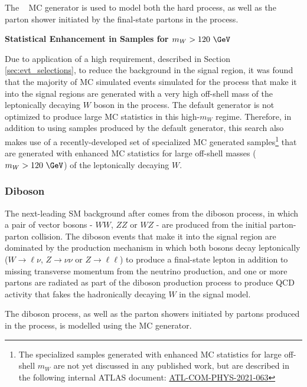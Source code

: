 The \SHERPA[2.2]~\cite{Gleisberg:2008ta} MC generator is used to model both the hard \wjets process, as well as the parton shower initiated by the final-state partons in the process. 

\medskip\noindent\textbf{Statistical Enhancement in \wjets Samples for \(m_W>120~\GeV\)}

Due to application of a high \mtlepmet requirement, described in Section \ref{sec:evt_selections}, to reduce the \wjets background in the signal region, it was found that the majority of MC simulated events simulated for the \wjets process that make it into the signal regions are generated with a very high off-shell mass of the leptonically decaying \(W\) boson in the process. The default \SHERPA[2.2] generator is not optimized to produce large MC statistics in this high-\(m_W\) regime. Therefore, in addition to using samples produced by the default \SHERPA[2.2] generator, this search also makes use of a recently-developed set of specialized \SHERPA[2.2] \wjets MC generated samples\footnote{The specialized samples generated with enhanced MC statistics for large off-shell \(m_W\) are not yet discussed in any published work, but are described in the following internal ATLAS document: \href{https://cds.cern.ch/record/2753199}{ATL-COM-PHYS-2021-063}} that are generated with enhanced MC statistics for large off-shell masses (\(m_W > 120~\GeV\)) of the leptonically decaying \(W\).

\subsubsection{Diboson}
\label{sec:diboson_description}

The next-leading SM background after \wjets comes from the diboson process, in which a pair of vector bosons - \(WW\), \(ZZ\) or \(WZ\) - are produced from the initial parton-parton collision. The diboson events that make it into the signal region are dominated by the production mechanism in which both bosons decay leptonically (\(W \rightarrow \ell\nu\), \(Z \rightarrow \nu\nu\) or \(Z \rightarrow \ell\ell\)) to produce a final-state lepton in addition to missing transverse momentum from the neutrino production, and one or more partons are radiated as part of the diboson production process to produce QCD activity that fakes the hadronically decaying \(W\) in the signal model. 

The diboson process, as well as the parton showers initiated by partons produced in the process, is modelled using the \SHERPA[2.2] MC generator. 

